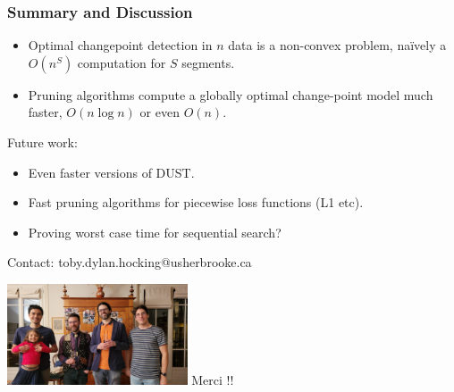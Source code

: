 \documentclass{beamer}
\begin{document}
\begin{frame}[fragile]
  \frametitle{Summary and Discussion}

  \begin{itemize}
  \item Optimal changepoint detection in $n$ data is a non-convex
    problem, na\" ively a $O(n^S)$ computation for $S$ segments.
  \item Pruning algorithms compute a globally optimal change-point
    model much faster, $O(n\log n)$ or even $O(n)$.
  \end{itemize}
  Future work:   
  \begin{itemize}
  \item Even faster versions of DUST.
  \item Fast pruning algorithms for piecewise loss functions (L1 etc).
  \item Proving worst case time for sequential search?
  \end{itemize}
  Contact: toby.dylan.hocking@usherbrooke.ca

  \centering
\includegraphics[height=3cm]{2025-01-photo-charles-toby-guillem-vincent.jpg}  Merci !!
\end{frame}
\end{document}
